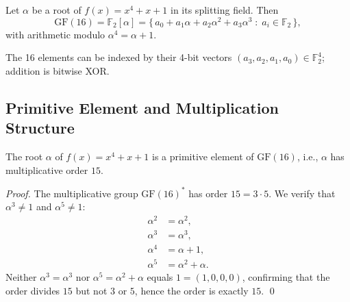 \begin{definition}
\label{def:gf16-std}
Let \(\alpha\) be a root of \(f(x)=x^4+x+1\) in its splitting field.
Then
\[
  \mathrm{GF}(16) = \mathbb{F}_2[\alpha]
    = \bigl\{\,a_0 + a_1\alpha + a_2\alpha^2 + a_3\alpha^3
               \;:\; a_i\in\mathbb{F}_2\,\bigr\},
\]
with arithmetic modulo \(\alpha^4 = \alpha + 1\).
\end{definition}

The 16 elements can be indexed by their 4-bit vectors
\((a_3,a_2,a_1,a_0)\in\mathbb{F}_2^4\); addition is bitwise XOR.

\subsection{Primitive Element and Multiplication Structure}
\label{sec:gf16-prim}

\begin{proposition}
The root \(\alpha\) of \(f(x)=x^4+x+1\) is a primitive element of
\(\mathrm{GF}(16)\), i.e., \(\alpha\) has multiplicative order \(15\).
\end{proposition}

\begin{proof}
The multiplicative group \(\mathrm{GF}(16)^*\) has order \(15=3\cdot 5\).
We verify that \(\alpha^3\neq 1\) and \(\alpha^5\neq 1\):
\begin{align*}
  \alpha^2 &= \alpha^2,\\
  \alpha^3 &= \alpha^3,\\
  \alpha^4 &= \alpha + 1,\\
  \alpha^5 &= \alpha^2 + \alpha.
\end{align*}
Neither \(\alpha^3 = \alpha^3\) nor \(\alpha^5 = \alpha^2+\alpha\)
equals \(1=(1,0,0,0)\), confirming that the order divides \(15\) but not \(3\) or \(5\),
hence the order is exactly \(15\).
\qed
\end{proof}

